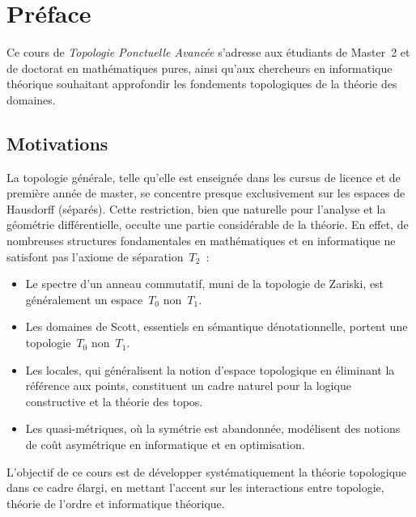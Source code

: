 \chapter*{Pr\'eface}

Ce cours de \emph{Topologie Ponctuelle Avanc\'ee} s'adresse aux \'etudiants de Master~2 et
de doctorat en math\'ematiques pures, ainsi qu'aux chercheurs en informatique th\'eorique
souhaitant approfondir les fondements topologiques de la th\'eorie des domaines.

\section*{Motivations}

La topologie g\'en\'erale, telle qu'elle est enseign\'ee dans les cursus de licence et de
premi\`ere ann\'ee de master, se concentre presque exclusivement sur les espaces de Hausdorff
(s\'epar\'es). Cette restriction, bien que naturelle pour l'analyse et la g\'eom\'etrie
diff\'erentielle, occulte une partie consid\'erable de la th\'eorie. En effet, de nombreuses
structures fondamentales en math\'ematiques et en informatique ne satisfont pas l'axiome de
s\'eparation~$T_2$~:

\begin{itemize}
  \item Le spectre d'un anneau commutatif, muni de la topologie de Zariski, est
    g\'en\'eralement un espace~$T_0$ non~$T_1$.
  \item Les domaines de Scott, essentiels en s\'emantique d\'enotationnelle, portent une
    topologie~$T_0$ non~$T_1$.
  \item Les locales, qui g\'en\'eralisent la notion d'espace topologique en \'eliminant la
    r\'ef\'erence aux points, constituent un cadre naturel pour la logique constructive et la
    th\'eorie des topos.
  \item Les quasi-m\'etriques, o\`u la sym\'etrie est abandonn\'ee, mod\'elisent des notions de
    co\^ut asym\'etrique en informatique et en optimisation.
\end{itemize}

L'objectif de ce cours est de d\'evelopper syst\'ematiquement la th\'eorie topologique dans ce
cadre \'elargi, en mettant l'accent sur les interactions entre topologie, th\'eorie de l'ordre
et informatique th\'eorique.

